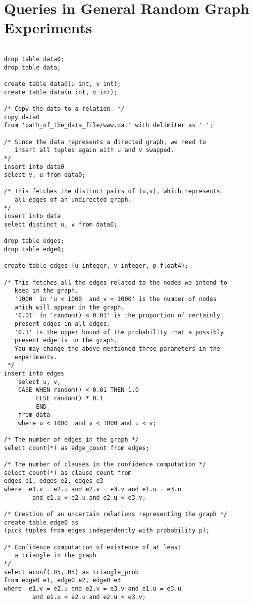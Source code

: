 \chapter{Queries in General Random Graph Experiments} 
\label{app:general-randgraph}

\begin{verbatim}

drop table data0;
drop table data;

create table data0(u int, v int);
create table data(u int, v int);

/* Copy the data to a relation. */
copy data0 
from 'path_of_the_data_file/www.dat' with delimiter as ' ';

/* Since the data represents a directed graph, we need to 
   insert all tuples again with u and v swapped. 
*/
insert into data0
select v, u from data0;

/* This fetches the distinct pairs of (u,v), which represents 
   all edges of an undirected graph.  
*/
insert into data
select distinct u, v from data0;

drop table edges;
drop table edge0;

create table edges (u integer, v integer, p float4);

/* This fetches all the edges related to the nodes we intend to 
   keep in the graph. 
   '1000' in 'u < 1000  and v < 1000' is the number of nodes 
   which will appear in the graph. 
   '0.01' in 'random() < 0.01' is the proportion of certainly 
   present edges in all edges.
   '0.1' is the upper bound of the probability that a possibly 
   present edge is in the graph.
   You may change the above-mentioned three parameters in the
   experiments.
 */
insert into edges
	select u, v,
   	CASE WHEN random() < 0.01 THEN 1.0  
         ELSE random() * 0.1           
         END	      
    from data
    where u < 1000  and v < 1000 and u < v; 

/* The number of edges in the graph */
select count(*) as edge_count from edges;

/* The number of clauses in the confidence computation */	
select count(*) as clause_count from 
edges e1, edges e2, edges e3 
where  e1.v = e2.u and e2.v = e3.v and e1.u = e3.u 
		and e1.u < e2.u and e2.u < e3.v;
	
/* Creation of an uncertain relations representing the graph */	
create table edge0 as 
(pick tuples from edges independently with probability p);
	
/* Confidence computation of existence of at least 
   a triangle in the graph  
*/		
select aconf(.05,.05) as triangle_prob 
from edge0 e1, edge0 e2, edge0 e3 
where  e1.v = e2.u and e2.v = e3.v and e1.u = e3.u 
		and e1.u < e2.u and e2.u < e3.v;

\end{verbatim}
\newpage

